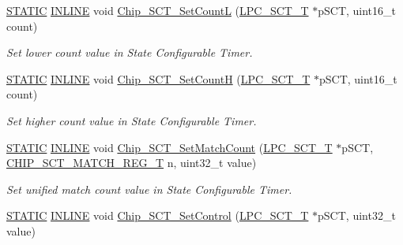 \begin{DoxyCompactItemize}
\hyperlink{group___l_p_c___types___public___macros_ga10b2d890d871e1489bb02b7e70d9bdfb}{S\+T\+A\+T\+IC} \hyperlink{spifi__18xx__43xx_8h_a2eb6f9e0395b47b8d5e3eeae4fe0c116}{I\+N\+L\+I\+NE} void \hyperlink{group___s_c_t__18_x_x__43_x_x_gac9d69eb39a8131925508015bf36c22f7}{Chip\+\_\+\+S\+C\+T\+\_\+\+Set\+CountL} (\hyperlink{struct_l_p_c___s_c_t___t}{L\+P\+C\+\_\+\+S\+C\+T\+\_\+T} $\ast$p\+S\+CT, uint16\+\_\+t count)
\begin{DoxyCompactList}\small\item\em Set lower count value in State Configurable Timer. \end{DoxyCompactList}\item 
\hyperlink{group___l_p_c___types___public___macros_ga10b2d890d871e1489bb02b7e70d9bdfb}{S\+T\+A\+T\+IC} \hyperlink{spifi__18xx__43xx_8h_a2eb6f9e0395b47b8d5e3eeae4fe0c116}{I\+N\+L\+I\+NE} void \hyperlink{group___s_c_t__18_x_x__43_x_x_ga794c84cef2db6931829894139eb6d514}{Chip\+\_\+\+S\+C\+T\+\_\+\+Set\+CountH} (\hyperlink{struct_l_p_c___s_c_t___t}{L\+P\+C\+\_\+\+S\+C\+T\+\_\+T} $\ast$p\+S\+CT, uint16\+\_\+t count)
\begin{DoxyCompactList}\small\item\em Set higher count value in State Configurable Timer. \end{DoxyCompactList}\item 
\hyperlink{group___l_p_c___types___public___macros_ga10b2d890d871e1489bb02b7e70d9bdfb}{S\+T\+A\+T\+IC} \hyperlink{spifi__18xx__43xx_8h_a2eb6f9e0395b47b8d5e3eeae4fe0c116}{I\+N\+L\+I\+NE} void \hyperlink{group___s_c_t__18_x_x__43_x_x_ga0a5b5db9102ca60bfd3f44406ab6763b}{Chip\+\_\+\+S\+C\+T\+\_\+\+Set\+Match\+Count} (\hyperlink{struct_l_p_c___s_c_t___t}{L\+P\+C\+\_\+\+S\+C\+T\+\_\+T} $\ast$p\+S\+CT, \hyperlink{group___s_c_t__18_x_x__43_x_x_gab0308855f6bb30035f3165d01df90e27}{C\+H\+I\+P\+\_\+\+S\+C\+T\+\_\+\+M\+A\+T\+C\+H\+\_\+\+R\+E\+G\+\_\+T} n, uint32\+\_\+t value)
\begin{DoxyCompactList}\small\item\em Set unified match count value in State Configurable Timer. \end{DoxyCompactList}\item 
\hyperlink{group___l_p_c___types___public___macros_ga10b2d890d871e1489bb02b7e70d9bdfb}{S\+T\+A\+T\+IC} \hyperlink{spifi__18xx__43xx_8h_a2eb6f9e0395b47b8d5e3eeae4fe0c116}{I\+N\+L\+I\+NE} void \hyperlink{group___s_c_t__18_x_x__43_x_x_gaf370d64d6ee199b7026bd784e1b27b8f}{Chip\+\_\+\+S\+C\+T\+\_\+\+Set\+Control} (\hyperlink{struct_l_p_c___s_c_t___t}{L\+P\+C\+\_\+\+S\+C\+T\+\_\+T} $\ast$p\+S\+CT, uint32\+\_\+t value)

\end{DoxyCompactItemize}
